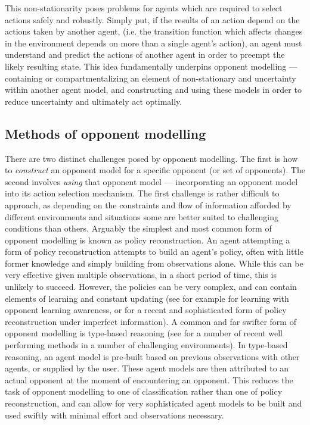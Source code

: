 \newline\newline
This non-stationarity poses problems for agents which are required to select actions safely and robustly. Simply put, if the results of an action depend on the actions taken by another agent, (i.e. the transition function which affects changes in the environment depends on more than a single agent's action), an agent must understand and predict the actions of another agent in order to preempt the likely resulting state. This idea fundamentally underpins opponent modelling --- containing or compartmentalizing an element of non-stationary and uncertainty within another agent model, and constructing and using these models in order to reduce uncertainty and ultimately act optimally. 

\subsection{Methods of opponent modelling}
There are two distinct challenges posed by opponent modelling. The first is how to \textit{construct} an opponent model for a specific opponent (or set of opponents). 
The second involves \textit{using} that opponent model --- incorporating an opponent model into its action selection mechanism. 
\newline \newline
The first challenge is rather difficult to approach, as depending on the constraints and flow of information afforded by different environments and situations some are better suited to challenging conditions than others. 
\newline \newline
Arguably the simplest and most common form of opponent modelling is known as policy reconstruction. An agent attempting a form of policy reconstruction attempts to build an agent's policy, often with little former knowledge and simply building from observations alone. While this can be very effective given multiple observations, in a short period of time, this is unlikely to succeed. However, the policies can be very complex, and can contain elements of learning and constant updating (see for example \cite{Leibo2017} for learning with opponent learning awareness, or \cite{mealing_shapiro_OM_by_expectation_maximisation} for a recent and sophisticated form of policy reconstruction under imperfect information). 
\newline \newline
A common and far swifter form of opponent modelling is type-based reasoning (see \cite{Evalulation_of_adhoc_teamwork_Barrett_Stone_Kraus} for a number of recent well performing methods in a number of challenging environments). In type-based reasoning, an agent model is pre-built based on previous observations with other agents, or supplied by the user. These agent models are then attributed to an actual opponent at the moment of encountering an opponent. This reduces the task of opponent modelling to one of classification rather than one of policy reconstruction, and can allow for very sophisticated agent models to be built and used swiftly with minimal effort and observations necessary. 
